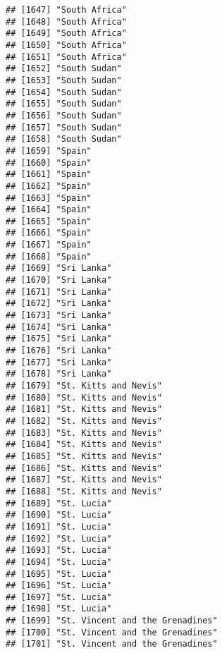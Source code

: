 \documentclass[]{article}
\begin{document}
\begin{verbatim}
## [1647] "South Africa"                       
## [1648] "South Africa"                       
## [1649] "South Africa"                       
## [1650] "South Africa"                       
## [1651] "South Africa"                       
## [1652] "South Sudan"                        
## [1653] "South Sudan"                        
## [1654] "South Sudan"                        
## [1655] "South Sudan"                        
## [1656] "South Sudan"                        
## [1657] "South Sudan"                        
## [1658] "South Sudan"                        
## [1659] "Spain"                              
## [1660] "Spain"                              
## [1661] "Spain"                              
## [1662] "Spain"                              
## [1663] "Spain"                              
## [1664] "Spain"                              
## [1665] "Spain"                              
## [1666] "Spain"                              
## [1667] "Spain"                              
## [1668] "Spain"                              
## [1669] "Sri Lanka"                          
## [1670] "Sri Lanka"                          
## [1671] "Sri Lanka"                          
## [1672] "Sri Lanka"                          
## [1673] "Sri Lanka"                          
## [1674] "Sri Lanka"                          
## [1675] "Sri Lanka"                          
## [1676] "Sri Lanka"                          
## [1677] "Sri Lanka"                          
## [1678] "Sri Lanka"                          
## [1679] "St. Kitts and Nevis"                
## [1680] "St. Kitts and Nevis"                
## [1681] "St. Kitts and Nevis"                
## [1682] "St. Kitts and Nevis"                
## [1683] "St. Kitts and Nevis"                
## [1684] "St. Kitts and Nevis"                
## [1685] "St. Kitts and Nevis"                
## [1686] "St. Kitts and Nevis"                
## [1687] "St. Kitts and Nevis"                
## [1688] "St. Kitts and Nevis"                
## [1689] "St. Lucia"                          
## [1690] "St. Lucia"                          
## [1691] "St. Lucia"                          
## [1692] "St. Lucia"                          
## [1693] "St. Lucia"                          
## [1694] "St. Lucia"                          
## [1695] "St. Lucia"                          
## [1696] "St. Lucia"                          
## [1697] "St. Lucia"                          
## [1698] "St. Lucia"                          
## [1699] "St. Vincent and the Grenadines"     
## [1700] "St. Vincent and the Grenadines"     
## [1701] "St. Vincent and the Grenadines"     

\end{verbatim}
\end{document}
